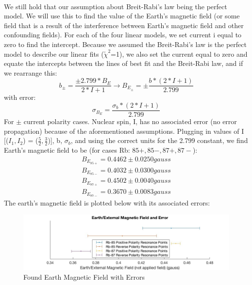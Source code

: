 \documentclass{article}
\begin{document}
\\\indent We still hold that our assumption about Breit-Rabi's law being the perfect model. We will use this to find the value of the Earth's magnetic field (or some field that is a result of the interference between Earth's magnetic field and other confounding fields). For each of the four linear models, we set current i equal to zero to find the intercept. Because we assumed the Breit-Rabi's law is the perfect model to describe our linear fits ($\tilde{\chi}^2$=1), we also set the current equal to zero and equate the intercepts between the lines of best fit and the Breit-Rabi law, and if we rearrange this:
\begin{equation}
      b_\pm = \frac{\pm2.799*B_E}{2*I + 1} \rightarrow B_{E_\pm} = \pm\frac{b*(2*I + 1)}{2.799}
\end{equation}
with error:
\begin{equation}
      \sigma_{B_E} = \frac{\sigma_b*(2*I + 1)}{2.799}
\end{equation}
For $\pm$ current polarity cases. Nuclear spin, I, has no associated error (no error propagation) because of the aforementioned assumptions. Plugging in values of I [($I_1,I_2$) = ($\frac{5}{2},\frac{3}{2}$)], b, $\sigma_b$, and using the correct units for the 2.799 constant, we find Earth's magnetic field to be (for cases Rb: $85+,85-,87+, 87-$):
\begin{equation}
      \begin{array}{c}
           B_{E_{85+}} = 0.4462 \pm 0.0250 gauss\\
           B_{E_{85-}} = 0.4032 \pm 0.0300 gauss\\
           B_{E_{87+}} = 0.4502 \pm 0.0040 gauss\\
           B_{E_{87-}} = 0.3670 \pm 0.0083 gauss
      \end{array}
\end{equation}
The earth's magnetic field is plotted below with its associated errors:
\begin{figure}[H] %
        \centering
        \includegraphics[scale = 0.25]{3.jpg}
        \caption{Found Earth Magnetic Field with Errors}
        \label{fig:my_label}
    \end{figure}
\end{document}
